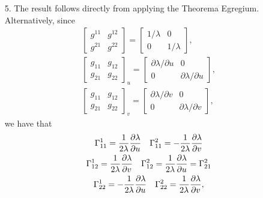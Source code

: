 \documentclass[a4paper,12pt]{article}
\theoremstyle{remark}
\begin{document}
\begin{enumerate}
    \item[5.]
        The result follows directly from applying the Theorema Egregium. Alternatively, since
        \begin{gather*}
            \left[ \begin{array}{cc}
                    g^{11} & g^{12} \\
                    g^{21} & g^{22}
            \end{array} \right]
            = \left[ \begin{array}{cc}
                    1/\lambda & 0 \\
                    0 & 1/\lambda
            \end{array} \right], \\
            \left[ \begin{array}{cc}
                    g_{11} & g_{12} \\
                    g_{21} & g_{22}
            \end{array} \right]_u
            = \left[ \begin{array}{cc}
                    \partial\lambda/\partial u & 0 \\
                    0 & \partial\lambda/\partial u
            \end{array} \right], \\
            \left[ \begin{array}{cc}
                    g_{11} & g_{12} \\
                    g_{21} & g_{22}
            \end{array} \right]_v
            = \left[ \begin{array}{cc}
                    \partial\lambda/\partial v & 0 \\
                    0 & \partial\lambda/\partial v
            \end{array} \right],
        \end{gather*}
        we have that
        \begin{gather*}
            \Gamma_{11}^1 = \frac{1}{2\lambda} \pdv{\lambda}{u} \quad
            \Gamma_{11}^2 = -\frac{1}{2\lambda} \pdv{\lambda}{v} \\
            \Gamma_{12}^1 = \frac{1}{2\lambda} \pdv{\lambda}{v} \quad
            \Gamma_{12}^2 = \frac{1}{2\lambda} \pdv{\lambda}{u} = \Gamma_{21}^2 \\
            \Gamma_{22}^1 = -\frac{1}{2\lambda} \pdv{\lambda}{u} \quad
            \Gamma_{22}^2 = \frac{1}{2\lambda} \pdv{\lambda}{v},

\end{gather*}
\end{enumerate}
\end{document}
